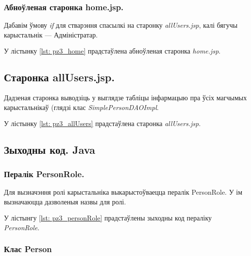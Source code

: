 \subsubsection{Абноўленая старонка home.jsp.}

Дабавім ўмову \textit{if} для стварэння спасылкі на старонку
\textit{allUsers.jsp}, калі бягучы карыстальнік --- Адміністратар.

У лістынку \ref{lst: pz3_home} прадстаўлена абноўленая старонка
\textit{home.jsp}.



\subsection{Старонка allUsers.jsp.}

Дадзеная старонка выводзіць у выглядзе табліцы
інфармацыю пра ўсіх магчымых карыстальнікаў (глядзі клас
\textit{SimplePersonDAOImpl}.

У лістынку \ref{lst: pz3_allUsers} прадстаўлена старонка
\textit{allUsers.jsp}.



\subsection{Зыходны код. Java}

\subsubsection{Пералік PersonRole.}

Для вызначэння ролі карыстальніка выкарыстоўваецца пералік PersonRole.
У ім вызначаюцца дазволеныя назвы для ролі.

У лістынгу \ref{lst: pz3_personRole} прадстаўлены зыходны код пераліку \textit{PersonRole}.



\vspace{-\baselineskip}
\subsubsection{Клас Person}

